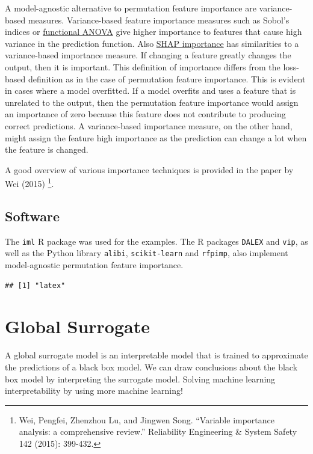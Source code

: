 \documentclass[
  11pt,
]{scrbook}
\begin{document}
A model-agnostic alternative to permutation feature importance are variance-based measures.
Variance-based feature importance measures such as Sobol's indices or \protect\hyperlink{decomposition}{functional ANOVA} give higher importance to features that cause high variance in the prediction function.
Also \protect\hyperlink{shap}{SHAP importance} has similarities to a variance-based importance measure.
If changing a feature greatly changes the output, then it is important.
This definition of importance differs from the loss-based definition as in the case of permutation feature importance.
This is evident in cases where a model overfitted.
If a model overfits and uses a feature that is unrelated to the output, then the permutation feature importance would assign an importance of zero because this feature does not contribute to producing correct predictions.
A variance-based importance measure, on the other hand, might assign the feature high importance as the prediction can change a lot when the feature is changed.

A good overview of various importance techniques is provided in the paper by Wei (2015) \footnote{Wei, Pengfei, Zhenzhou Lu, and Jingwen Song. ``Variable importance analysis: a comprehensive review.'' Reliability Engineering \& System Safety 142 (2015): 399-432.}.

\hypertarget{software-3}{%
\subsection{Software}\label{software-3}}

The \texttt{iml} R package was used for the examples.
The R packages \texttt{DALEX} and \texttt{vip}, as well as the Python library \texttt{alibi}, \texttt{scikit-learn} and \texttt{rfpimp}, also implement model-agnostic permutation feature importance.

\begin{verbatim}
## [1] "latex"
\end{verbatim}

\newpage

\hypertarget{global}{%
\section{Global Surrogate}\label{global}}

A global surrogate model is an interpretable model that is trained to approximate the predictions of a black box model.
We can draw conclusions about the black box model by interpreting the surrogate model.
Solving machine learning interpretability by using more machine learning!
\end{document}
